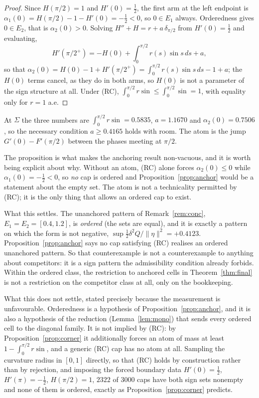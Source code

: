 \documentclass[11pt]{article}
\theoremstyle{definition}
\newcommand{\Sig}{\Sigma}
\begin{document}
\begin{proof}
Since $H(\pi/2)=1$ and $H'(0)=\tfrac12$, the first arm at the left endpoint is
$\alpha_1(0)=H(\pi/2)-1-H'(0)=-\tfrac12<0$, so $0\in E_1$ always. Orderedness gives
$0\in E_2$, that is $\alpha_2(0)>0$. Solving $H''+H=r+a\,\delta_{\pi/2}$ from
$H'(0)=\tfrac12$ and evaluating,
\[
  H'(\pi/2^+)=-H(0)+\int_0^{\pi/2} r(s)\sin s\,ds+a ,
\]
so that $\alpha_2(0)=H(0)-1+H'(\pi/2^+)=\int_0^{\pi/2} r(s)\sin s\,ds-1+a$; the $H(0)$
terms cancel, as they do in both arms, so $H(0)$ is not a parameter of the sign structure
at all. Under (RC), $\int_0^{\pi/2} r\sin\le\int_0^{\pi/2}\sin=1$, with equality only for
$r=1$ a.e.
\end{proof}

At $\Sig$ the three numbers are $\int_0^{\pi/2}r\sin=0.5835$, $a=1.1670$ and
$\alpha_2(0)=0.7506$, so the necessary condition $a\ge0.4165$ holds with room. The atom is
the jump $G'(0)-F'(\pi/2)$ between the phases meeting at $\pi/2$.

The proposition is what makes the anchoring result non-vacuous, and it is worth being
explicit about why. Without an atom, (RC) alone forces $\alpha_2(0)\le0$ while
$\alpha_1(0)=-\tfrac12<0$, so \emph{no} cap is ordered and
Proposition~\ref{prop:anchor} would be a statement about the empty set. The atom is not a
technicality permitted by (RC); it is the only thing that allows an ordered cap to exist.

What this settles. The unanchored pattern of Remark~\ref{rem:conc},
$E_1=E_2=[0.4,1.2]$, is \emph{ordered} (the sets are equal), and it is exactly a pattern
on which the form is not negative, $\sup\tfrac12\delta^2Q/\|\eta\|^2=+0.4123$.
Proposition~\ref{prop:anchor} says no cap satisfying (RC) realises an ordered unanchored
pattern. So that counterexample is not a counterexample to anything about competitors: it
is a sign pattern the admissibility condition already forbids. Within the ordered class,
the restriction to anchored cells in Theorem~\ref{thm:final} is not a restriction on the
competitor class at all, only on the bookkeeping.

What this does not settle, stated precisely because the measurement is unfavourable.
Orderedness is a hypothesis of Proposition~\ref{prop:anchor}, and it is also a hypothesis
of the reduction (Lemma~\ref{lem:mono}) that sends every ordered cell to the diagonal
family. It is not implied by (RC): by Proposition~\ref{prop:corner} it additionally forces
an atom of mass at least $1-\int_0^{\pi/2}r\sin$, and a generic (RC) cap has no atom at
all. Sampling the curvature radius in $[0,1]$ directly, so that (RC) holds by construction
rather than by rejection, and imposing the forced boundary data $H'(0)=\tfrac12$,
$H'(\pi)=-\tfrac12$, $H(\pi/2)=1$, $2322$ of $3000$ caps have both sign sets nonempty and
none of them is ordered, exactly as Proposition~\ref{prop:corner} predicts.
\end{document}
